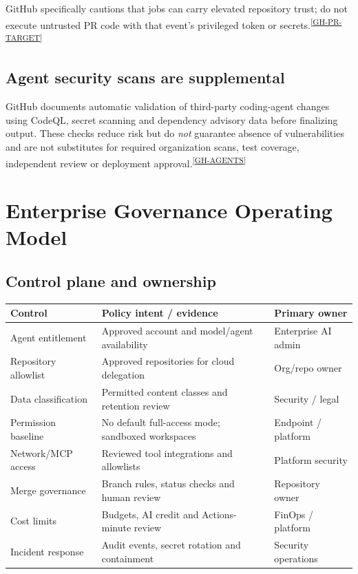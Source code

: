 \documentclass[11pt,letterpaper,oneside]{article}
\newcommand{\cmd}[1]{\path{#1}}
\newcommand{\src}[1]{\textsuperscript{\hyperref[ref:#1]{[#1]}}}
\begin{document}
GitHub specifically cautions that \cmd{pull_request_target} jobs can carry elevated repository trust; do not execute untrusted PR code with that event's privileged token or secrets.\src{GH-PR-TARGET}

\subsection{Agent security scans are supplemental}
GitHub documents automatic validation of third-party coding-agent changes using CodeQL, secret scanning and dependency advisory data before finalizing output. These checks reduce risk but do \emph{not} guarantee absence of vulnerabilities and are not substitutes for required organization scans, test coverage, independent review or deployment approval.\src{GH-AGENTS}

\section{Enterprise Governance Operating Model}
\subsection{Control plane and ownership}
\begin{table}[htbp]
\small
\centering
\begin{tabularx}{\linewidth}{@{}>{\raggedright\arraybackslash}p{3.0cm}Y >{\raggedright\arraybackslash}p{2.3cm}@{}}
\toprule
\textbf{Control} & \textbf{Policy intent / evidence} & \textbf{Primary owner}\tabularnewline\midrule
Agent entitlement & Approved account and model/agent availability & Enterprise AI admin\\
Repository allowlist & Approved repositories for cloud delegation & Org/repo owner\\
Data classification & Permitted content classes and retention review & Security / legal\\
Permission baseline & No default full-access mode; sandboxed workspaces & Endpoint / platform\\
Network/MCP access & Reviewed tool integrations and allowlists & Platform security\\
Merge governance & Branch rules, status checks and human review & Repository owner\\
Cost limits & Budgets, AI credit and Actions-minute review & FinOps / platform\\
Incident response & Audit events, secret rotation and containment & Security operations\\
\bottomrule
\end{tabularx}
\end{table}
\end{document}
